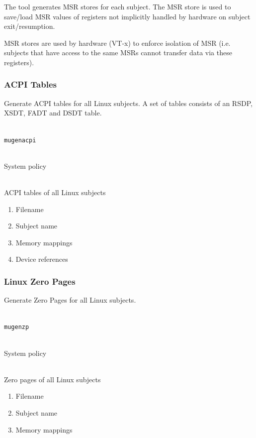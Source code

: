 \documentclass[a4paper,twoside,titlepage]{article}
\begin{document}
The tool generates MSR stores for each subject. The MSR store is used to
save/load MSR values of registers not implicitly handled by hardware on subject
exit/resumption.

MSR stores are used by hardware (VT-x) to enforce isolation of MSR (i.e.
subjects that have access to the same MSRs cannot transfer data via these
registers).

\subsubsection{ACPI Tables}
Generate ACPI tables for all Linux subjects. A set of tables consists of an
RSDP, XSDT, FADT and DSDT table.

\begin{description} \itemsep1pt \parskip0pt
	\item[Name] \hfill \\
		\texttt{mugenacpi}
	\item[Input] \hfill \\
		System policy
	\item[Output] \hfill \\
		ACPI tables of all Linux subjects
	\item[Data] \hfill
		\begin{enumerate}
			\item Filename
			\item Subject name
			\item Memory mappings
			\item Device references
		\end{enumerate}
\end{description}

\subsubsection{Linux Zero Pages}
Generate Zero Pages for all Linux subjects.

\begin{description} \itemsep1pt \parskip0pt
	\item[Name] \hfill \\
		\texttt{mugenzp}
	\item[Input] \hfill \\
		System policy
	\item[Output] \hfill \\
		Zero pages of all Linux subjects
	\item[Data] \hfill
		\begin{enumerate}
			\item Filename
			\item Subject name
			\item Memory mappings
		\end{enumerate}
\end{description}
\end{document}
